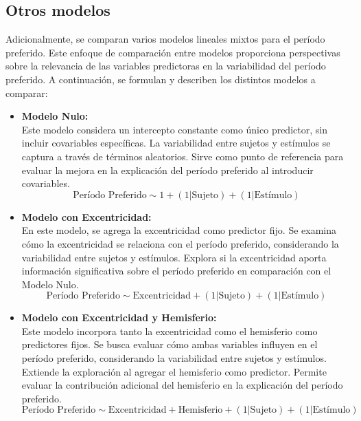 \subsection{Otros modelos} \label{compare_mlm}

Adicionalmente, se comparan varios modelos lineales mixtos para el período preferido. Este enfoque de comparación entre modelos proporciona perspectivas sobre la relevancia de las variables predictoras en la variabilidad del período preferido. A continuación, se formulan y describen los distintos modelos a comparar:

\begin{itemize}
	\item \textbf{Modelo Nulo:}	\\
	Este modelo considera un intercepto constante como único predictor, sin incluir covariables específicas. La variabilidad entre sujetos y estímulos se captura a través de términos aleatorios. Sirve como punto de referencia para evaluar la mejora en la explicación del período preferido al introducir covariables.
	\begin{equation}
		\text{Período Preferido} \sim 1 + (1|\text{Sujeto}) + (1|\text{Estímulo})	
		\label{m_1}
	\end{equation}

	\item\textbf{Modelo con Excentricidad:}\\
	En este modelo, se agrega la excentricidad como predictor fijo. Se examina cómo la excentricidad se relaciona con el período preferido, considerando la variabilidad entre sujetos y estímulos. Explora si la excentricidad aporta información significativa sobre el período preferido en comparación con el Modelo Nulo.
	\begin{equation}
		\text{Período Preferido} \sim \text{Excentricidad} + (1|\text{Sujeto}) + (1|\text{Estímulo})	
		\label{m_2}
	\end{equation}

	\item \textbf{Modelo con Excentricidad y Hemisferio:}\\
	Este modelo incorpora tanto la excentricidad como el hemisferio como predictores fijos. Se busca evaluar cómo ambas variables influyen en el período preferido, considerando la variabilidad entre sujetos y estímulos. Extiende la exploración al agregar el hemisferio como predictor. Permite evaluar la contribución adicional del hemisferio en la explicación del período preferido.
	\begin{equation}
		\text{Período Preferido} \sim \text{Excentricidad} + \text{Hemisferio} + (1|\text{Sujeto}) + (1|\text{Estímulo})	
		\label{m_3}
	\end{equation}
	
\end{itemize}

